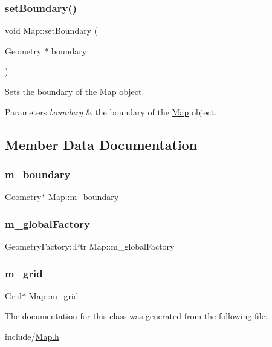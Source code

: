 \subsubsection{\texorpdfstring{setBoundary()}{setBoundary()}}
{\footnotesize\ttfamily void Map\+::set\+Boundary (\begin{DoxyParamCaption}\item[{Geometry $\ast$}]{boundary }\end{DoxyParamCaption})}

Sets the boundary of the \mbox{\hyperlink{class_map}{Map}} object. 
\begin{DoxyParams}{Parameters}
{\em boundary} & the boundary of the \mbox{\hyperlink{class_map}{Map}} object. \\
\hline
\end{DoxyParams}


\subsection{Member Data Documentation}
\mbox{\label{class_map_af2c95561cb4ff3b9950240351cf4303c}} 
\subsubsection{\texorpdfstring{m\_boundary}{m\_boundary}}
{\footnotesize\ttfamily Geometry$\ast$ Map\+::m\+\_\+boundary\hspace{0.3cm}{\ttfamily [private]}}

\mbox{\label{class_map_ac5f30e6c144955a3638192495fd7d843}} 
\subsubsection{\texorpdfstring{m\_globalFactory}{m\_globalFactory}}
{\footnotesize\ttfamily Geometry\+Factory\+::\+Ptr Map\+::m\+\_\+global\+Factory\hspace{0.3cm}{\ttfamily [private]}}

\mbox{\label{class_map_a0fc16621dbe307d36170c3a96b24b7d9}} 
\subsubsection{\texorpdfstring{m\_grid}{m\_grid}}
{\footnotesize\ttfamily \mbox{\hyperlink{class_grid}{Grid}}$\ast$ Map\+::m\+\_\+grid\hspace{0.3cm}{\ttfamily [private]}}



The documentation for this class was generated from the following file\+:\begin{DoxyCompactItemize}
\item 
include/\mbox{\hyperlink{_map_8h}{Map.\+h}}\end{DoxyCompactItemize}

